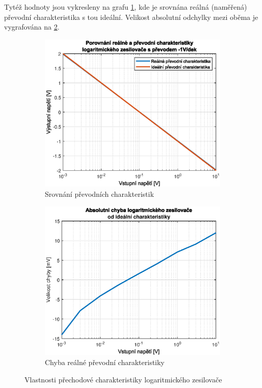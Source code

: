 \documentclass[twoside]{article}
\begin{document}
Tytéž hodnoty jsou vykresleny na grafu \ref{fig:prevod_char}, kde je srovnána reálná (naměřená) převodní charakteristika
s tou ideální. Velikost absolutní odchylky mezi oběma je vygrafována na \ref{fig:chyba}.

\begin{figure}[h!]
    \centering
    \begin{subfigure}{0.48\textwidth}
        \centering
        \includegraphics[width=1\linewidth]{prevod_char.eps}
        \caption{Srovnání převodních charakteristik}
        \label{fig:prevod_char}
    \end{subfigure}
    \begin{subfigure}{0.48\textwidth}
        \centering
        \includegraphics[width=1\linewidth]{chyba_prevodu.eps}
        \caption{Chyba reálné převodní charakteristiky}
        \label{fig:chyba}
    \end{subfigure}

    \caption{Vlastnosti přechodové charakteristiky logaritmického zesilovače}
    \label{fig:step}
\end{figure}
\end{document}
